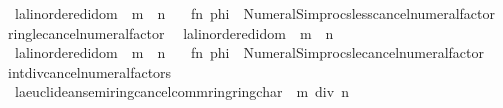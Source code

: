 \begin{isabellebody}
\ \ {\isacharbar}{\kern0pt}{\isachardoublequoteopen}{\isacharparenleft}{\kern0pt}l{\isacharcolon}{\kern0pt}{\isacharcolon}{\kern0pt}{\isacharprime}{\kern0pt}a{\isacharcolon}{\kern0pt}{\isacharcolon}{\kern0pt}linordered{\isacharunderscore}{\kern0pt}idom{\isacharparenright}{\kern0pt}\ {\isacharless}{\kern0pt}\ m\ {\isacharasterisk}{\kern0pt}\ n{\isachardoublequoteclose}{\isacharparenright}{\kern0pt}\ {\isacharequal}{\kern0pt}\isanewline
\ \ {\isacartoucheopen}fn\ phi\ {\isacharequal}{\kern0pt}{\isachargreater}{\kern0pt}\ Numeral{\isacharunderscore}{\kern0pt}Simprocs{\isachardot}{\kern0pt}less{\isacharunderscore}{\kern0pt}cancel{\isacharunderscore}{\kern0pt}numeral{\isacharunderscore}{\kern0pt}factor{\isacartoucheclose}\isanewline
\isanewline
{}\isamarkupfalse%
\ ring{\isacharunderscore}{\kern0pt}le{\isacharunderscore}{\kern0pt}cancel{\isacharunderscore}{\kern0pt}numeral{\isacharunderscore}{\kern0pt}factor\isanewline
\ \ {\isacharparenleft}{\kern0pt}{\isachardoublequoteopen}{\isacharparenleft}{\kern0pt}l{\isacharcolon}{\kern0pt}{\isacharcolon}{\kern0pt}{\isacharprime}{\kern0pt}a{\isacharcolon}{\kern0pt}{\isacharcolon}{\kern0pt}linordered{\isacharunderscore}{\kern0pt}idom{\isacharparenright}{\kern0pt}\ {\isacharasterisk}{\kern0pt}\ m\ {\isacharless}{\kern0pt}{\isacharequal}{\kern0pt}\ n{\isachardoublequoteclose}\isanewline
\ \ {\isacharbar}{\kern0pt}{\isachardoublequoteopen}{\isacharparenleft}{\kern0pt}l{\isacharcolon}{\kern0pt}{\isacharcolon}{\kern0pt}{\isacharprime}{\kern0pt}a{\isacharcolon}{\kern0pt}{\isacharcolon}{\kern0pt}linordered{\isacharunderscore}{\kern0pt}idom{\isacharparenright}{\kern0pt}\ {\isacharless}{\kern0pt}{\isacharequal}{\kern0pt}\ m\ {\isacharasterisk}{\kern0pt}\ n{\isachardoublequoteclose}{\isacharparenright}{\kern0pt}\ {\isacharequal}{\kern0pt}\isanewline
\ \ {\isacartoucheopen}fn\ phi\ {\isacharequal}{\kern0pt}{\isachargreater}{\kern0pt}\ Numeral{\isacharunderscore}{\kern0pt}Simprocs{\isachardot}{\kern0pt}le{\isacharunderscore}{\kern0pt}cancel{\isacharunderscore}{\kern0pt}numeral{\isacharunderscore}{\kern0pt}factor{\isacartoucheclose}\isanewline
\isanewline
\isanewline
{}\isamarkupfalse%
\ int{\isacharunderscore}{\kern0pt}div{\isacharunderscore}{\kern0pt}cancel{\isacharunderscore}{\kern0pt}numeral{\isacharunderscore}{\kern0pt}factors\isanewline
\ \ {\isacharparenleft}{\kern0pt}{\isachardoublequoteopen}{\isacharparenleft}{\kern0pt}{\isacharparenleft}{\kern0pt}l{\isacharcolon}{\kern0pt}{\isacharcolon}{\kern0pt}{\isacharprime}{\kern0pt}a{\isacharcolon}{\kern0pt}{\isacharcolon}{\kern0pt}{\isacharbraceleft}{\kern0pt}euclidean{\isacharunderscore}{\kern0pt}semiring{\isacharunderscore}{\kern0pt}cancel{\isacharcomma}{\kern0pt}comm{\isacharunderscore}{\kern0pt}ring{\isacharunderscore}{\kern0pt}{}{\isacharcomma}{\kern0pt}ring{\isacharunderscore}{\kern0pt}char{\isacharunderscore}{\kern0pt}{}{\isacharbraceright}{\kern0pt}{\isacharparenright}{\kern0pt}\ {\isacharasterisk}{\kern0pt}\ m{\isacharparenright}{\kern0pt}\ div\ n{\isachardoublequoteclose}\isanewline

\end{isabellebody}

